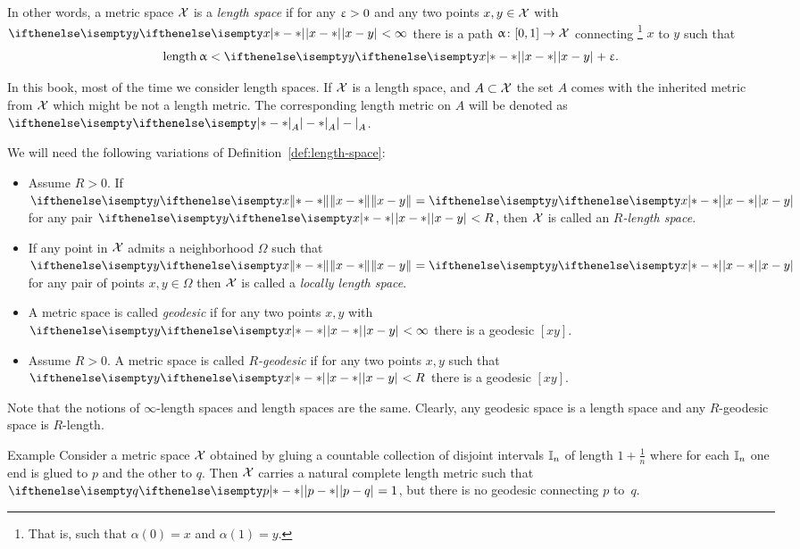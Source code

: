 In other words, a metric space $\mathcal{X}$ is a
\emph{length space}
if for any $\upvarepsilon>0$ and any two points $x,y\in \spc{X}$ with $\dist{x}{y}{}<\infty$ there is a path $\alpha\:[0,1]\to\spc{X}$ connecting%
\footnote{That is, such that $\alpha(0)=x$ and $\alpha(1)=y$.}
 $x$ to $y$
such that 
\[\length\alpha<\dist{x}{y}{}+\eps.\]

In this book, most of the time we consider length spaces.
If $\mathcal{X}$ is a length space, 
and $A\subset \spc{X}$ the set $A$ comes with the inherited metric from $\mathcal{X}$ 
which might be not a length metric.
The corresponding length metric on $A$ will be denoted as $\dist{}{}{A}$.


We will need the following variations of Definition~\ref{def:length-space}:

\begin{itemize}
\item Assume $R>0$.
If $\yetdist{x}{y}{}=\dist{x}{y}{}$ for any pair $\dist{x}{y}{}<R$, then $\mathcal{X}$ is called an \emph{$R$-length space}.
\item If any point in $\mathcal{X}$ admits a neighborhood  $\Omega$ such that $\yetdist{x}{y}{}=\dist{x}{y}{}$ for any pair of points $x,y\in \Omega$
then  $\mathcal{X}$ is called a \emph{locally length space}.
\item A metric space is called 
\emph{geodesic}
if for any two points $x,y$ with $\dist{x}{y}{}<\infty$ there is a geodesic $[x y]$.
\item Assume $R>0$. A metric space is called 
\emph{$R$-geodesic}
if for any two points $x,y$ such that $\dist{x}{y}{}<R$ there is a geodesic $[x y]$.
\end{itemize}

Note that the notions of $\infty$-length spaces and length spaces are the same.
Clearly, any geodesic space is a length space 
and any $R$-geodesic space is $R$-length.

\begin{thm}{Example} 
Consider a metric space $\mathcal{X}$ obtained by gluing a countable collection of disjoint intervals $\mathbb{I}_n$ of length $1+\tfrac1n$ where for each $\mathbb{I}_n$ one end is glued to $p$ and the other to $q$.
Then $\mathcal{X}$ carries a natural complete length metric such that $\dist{p}{q}{}=1$, but there is no geodesic connecting $p$ to~$q$.
\end{thm}

